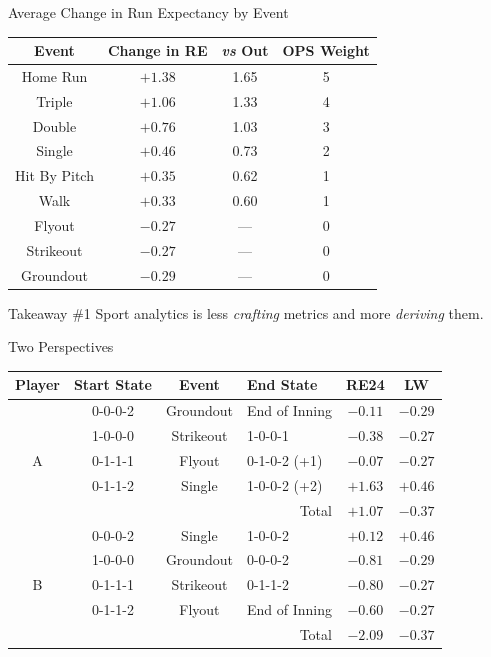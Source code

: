 \documentclass[handout]{beamer}
\begin{document}
\begin{frame}{Average Change in Run Expectancy by Event}
  \begin{tabular}{c|ccc}
    Event         & Change in RE  & {\it vs} Out & OPS Weight\\
    \hline
    Home Run      & $+1.38$       & 1.65    & 5\\
    Triple        & $+1.06$       & 1.33    & 4\\
    Double        & $+0.76$       & 1.03    & 3\\
    Single        & $+0.46$       & 0.73    & 2\\
    Hit By Pitch  & $+0.35$       & 0.62    & 1\\
    Walk          & $+0.33$       & 0.60    & 1\\
    Flyout        & $-0.27$       & ---     & 0\\
    Strikeout     & $-0.27$       & ---     & 0\\
    Groundout     & $-0.29$       & ---     & 0\\
  \end{tabular}
\end{frame}

\begin{frame}{Takeaway \#1}
  Sport analytics is less {\it crafting} metrics and more {\it deriving} them.
\end{frame}

\begin{frame}{Two Perspectives}
  \centering
  \footnotesize
  \begin{tabular}{c|ccl|cc}
    Player  & Start State & Event     & End State     & RE24    & LW\\
    \hline
            & 0-0-0-2     & Groundout & End of Inning & $-0.11$ & $-0.29$\\
            & 1-0-0-0     & Strikeout & 1-0-0-1       & $-0.38$ & $-0.27$\\
    A       & 0-1-1-1     & Flyout    & 0-1-0-2 (+1)  & $-0.07$ & $-0.27$\\
            & 0-1-1-2     & Single    & 1-0-0-2 (+2)  & $+1.63$ & $+0.46$\\
      & \multicolumn{3}{r|}{\color{ricegray} Total} & \color{ricegray} $+1.07$ & \color{ricegray} $-0.37$\\
    \hline
            & 0-0-0-2     & Single    & 1-0-0-2       & $+0.12$ & $+0.46$\\
            & 1-0-0-0     & Groundout & 0-0-0-2       & $-0.81$ & $-0.29$\\
    B       & 0-1-1-1     & Strikeout & 0-1-1-2       & $-0.80$ & $-0.27$\\
            & 0-1-1-2     & Flyout    & End of Inning & $-0.60$ & $-0.27$\\
      & \multicolumn{3}{r|}{\color{ricegray} Total} & \color{ricegray} $-2.09$ & \color{ricegray} $-0.37$\\
  \end{tabular}
\end{frame}
\end{document}
